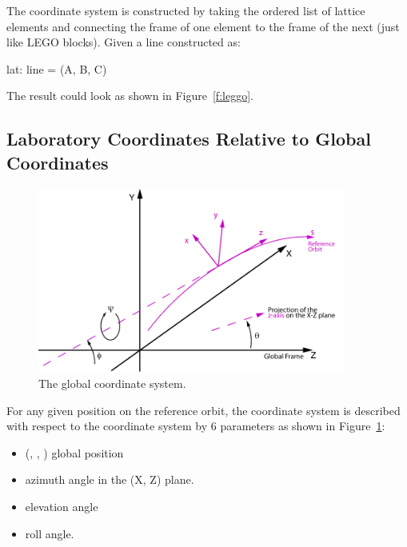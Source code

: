 \documentclass{hitec}
\begin{document}
The  coordinate system is constructed by taking the ordered list of lattice elements and
connecting the   frame of one element to the  
frame of the next (just like LEGO blocks). Given a line constructed as:
\begin{code}
    lat: line = (A, B, C)
\end{code}
The result could look as shown in Figure~\ref{f:leggo}.


\newpage

\subsection{Laboratory Coordinates Relative to Global Coordinates}
\label{s:lab.rel.glob}

\begin{figure}[tb]
  \centering
  \includegraphics[width=0.9\textwidth]{global-coords.pdf}
  \caption{The global coordinate system.}
  \label{f:global}
\end{figure}

For any given position on the reference orbit, the  coordinate system is described with
respect to the  coordinate system by 6 parameters as shown in Figure~\ref{f:global}:
\vspace{-10 pt}
\begin{itemize}
\item (, , ) global position
\item \vn{$\theta$} azimuth angle in the (X, Z) plane.
\item \vn{$\phi$} elevation angle
\item \vn{$\psi$} roll angle.
\end{itemize}
\end{document}
